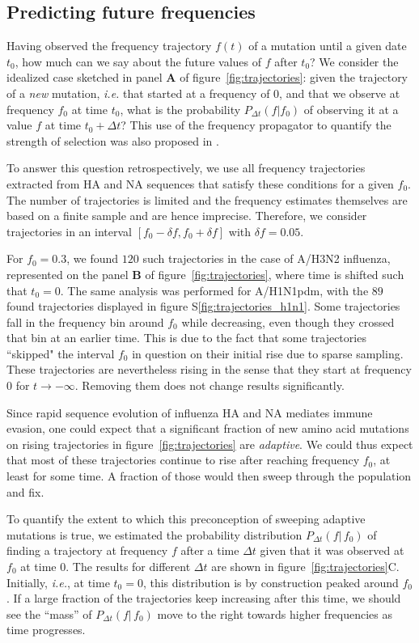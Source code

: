 \documentclass[reprint,amsmath,amssymb,superscriptaddress,showpacs,rmp]{revtex4-1}
\newcommand{\sref}[1]{S\ref{#1}}
\begin{document}
\subsection*{Predicting future frequencies}
Having observed the frequency trajectory $f(t)$ of a mutation until a given date $t_0$, how much can we say about the future values of $f$ after $t_0$?
We consider the idealized case sketched in panel \textbf{A} of figure~\ref{fig:trajectories}: given the trajectory of a \emph{new} mutation, \emph{i.e.} that started at a frequency of 0, and that we observe at frequency $f_0$ at time $t_0$, what is the probability $P_{\Delta t}(f\vert f_0)$ of observing it at a value $f$ at time $t_0 + \Delta t$? 
This use of the frequency propagator to quantify the strength of selection was also proposed in \citep{strelkowa_clonal_2012}. 

To answer this question retrospectively, we use all frequency trajectories extracted from HA and NA sequences that satisfy these conditions for a given $f_0$.  The number of trajectories is limited and the frequency estimates themselves are based on a finite sample and are hence imprecise.
Therefore, we consider trajectories in an interval $[f_0-\delta f, f_0+\delta f]$ with $\delta f = 0.05$.

For $f_0=0.3$, we found $120$ such trajectories in the case of A/H3N2 influenza, represented on the panel \textbf{B} of figure~\ref{fig:trajectories}, where time is shifted such that $t_0 = 0$. The same analysis was performed for A/H1N1pdm, with the $89$ found trajectories displayed in figure \sref{fig:trajectories_h1n1}.
Some trajectories fall in the frequency bin around $f_0$ while decreasing, even though they crossed that bin at an earlier time.
This is due to the fact that some trajectories ``skipped" the interval $f_0$ in question on their initial rise due to sparse sampling.
These trajectories are nevertheless rising in the sense that they start at frequency 0 for $t\rightarrow -\infty$.
Removing them does not change results significantly.

Since rapid sequence evolution of influenza HA and NA mediates immune evasion, one could expect that a significant fraction of new amino acid mutations on rising trajectories in figure~\ref{fig:trajectories} are \emph{adaptive}.
We could thus expect that most of these trajectories continue to rise after reaching frequency $f_0$, at least for some time.
A fraction of those would then sweep through the population and fix.

To quantify the extent to which this preconception of sweeping adaptive mutations is true, we estimated the probability distribution $P_{\Delta t}(f\vert\,f_0)$ of finding a trajectory at frequency $f$ after a time $\Delta t$ given that it was observed at $f_0$ at time $0$.
The results for different $\Delta t$ are shown in figure~\ref{fig:trajectories}C.
Initially, \emph{i.e.}, at time $t_0=0$, this distribution is by construction peaked around $f_0$.
If a large fraction of the trajectories keep increasing after  this time, we should see the ``mass'' of $P_{\Delta t}(f\vert\,f_0)$ move to the right towards higher frequencies as time progresses.
\end{document}
